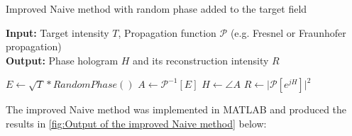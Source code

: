 \begin{algorithm}[H]
  \caption{Improved Naive method with random phase added to the target field}\label{alg:Naive algorithm with random phase}
  \textbf{Input:} Target intensity $T$, Propagation function $\mathcal{P}$ (e.g. Fresnel or Fraunhofer propagation)\\
  \textbf{Output:} Phase hologram $H$ and its reconstruction intensity $R$
  \begin{algorithmic}
    \State $E \gets \sqrt{T} * RandomPhase()$
    \State $A \gets \mathcal{P}^{-1}[E]$
    \State $H \gets \angle A$
    \State $R \gets \vert \mathcal{P}[e^{jH}] \vert ^2 $
  \end{algorithmic}
\end{algorithm}

The improved Naive method was implemented in MATLAB and produced the results in \cref{fig:Output of the improved Naive method} below:

